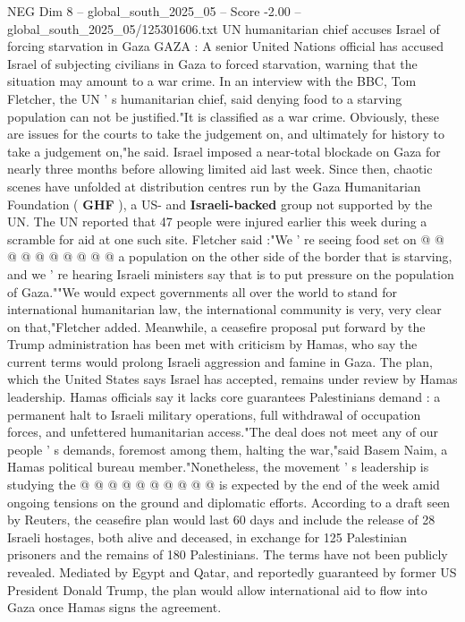 \begin{textsample}{NEG Dim 8 – global\_south\_2025\_05 – Score -2.00 – global\_south\_2025\_05/125301606.txt}  \label{ex:f8_neg_003}
UN humanitarian chief accuses Israel of forcing starvation in Gaza GAZA : A senior United Nations official has accused Israel of subjecting civilians in Gaza to forced starvation, warning that the situation may amount to a war crime.
In an interview with the BBC, Tom Fletcher, the UN ' s humanitarian chief, said denying food to a starving population can not be justified."It is classified as a war crime.
Obviously, these are issues for the courts to take the judgement on, and ultimately for history to take a judgement on,"he said.
Israel imposed a near-total blockade on Gaza for nearly three months before allowing limited aid last week.
Since then, chaotic scenes have unfolded at distribution centres run by the Gaza Humanitarian Foundation ( \textbf{GHF} ), a US- and \textbf{Israeli-backed} group not supported by the UN.
The UN reported that 47 people were injured earlier this week during a scramble for aid at one such site.
Fletcher said :"We ' re seeing food set on @ @ @ @ @ @ @ @ @ @ a population on the other side of the border that is starving, and we ' re hearing Israeli ministers say that is to put pressure on the population of Gaza.""We would expect governments all over the world to stand for international humanitarian law, the international community is very, very clear on that,"Fletcher added.
Meanwhile, a ceasefire proposal put forward by the Trump administration has been met with criticism by Hamas, who say the current terms would prolong Israeli aggression and famine in Gaza.
The plan, which the United States says Israel has accepted, remains under review by Hamas leadership.
Hamas officials say it lacks core guarantees Palestinians demand : a permanent halt to Israeli military operations, full withdrawal of occupation forces, and unfettered humanitarian access."The deal does not meet any of our people ' s demands, foremost among them, halting the war,"said Basem Naim, a Hamas political bureau member."Nonetheless, the movement ' s leadership is studying the @ @ @ @ @ @ @ @ @ @ is expected by the end of the week amid ongoing tensions on the ground and diplomatic efforts.
According to a draft seen by Reuters, the ceasefire plan would last 60 days and include the release of 28 Israeli hostages, both alive and deceased, in exchange for 125 Palestinian prisoners and the remains of 180 Palestinians.
The terms have not been publicly revealed.
Mediated by Egypt and Qatar, and reportedly guaranteed by former US President Donald Trump, the plan would allow international aid to flow into Gaza once Hamas signs the agreement.

\end{textsample}

